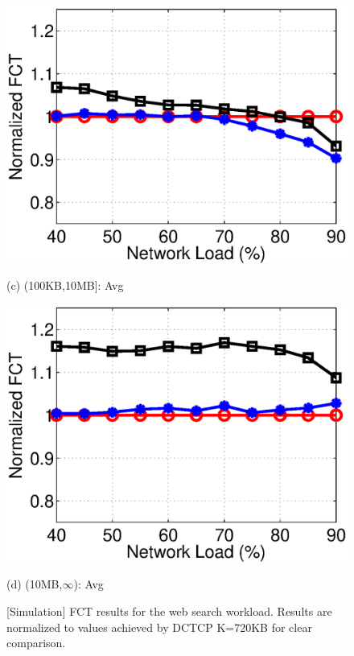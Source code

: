 \begin{figure}[t]
\begin{minipage}{0.245\linewidth}
   \includegraphics[width=1\linewidth]{figs/websearch_medium_avg_fct.eps}
   \centerline{(c) (100KB,10MB]: Avg}
\end{minipage}
\begin{minipage}{0.245\linewidth}
   \includegraphics[width=1\linewidth]{figs/websearch_large_avg_fct.eps}
   \centerline{(d) (10MB,$\infty$): Avg}
\end{minipage}
  \vspace{-1mm}
\caption{[Simulation] FCT results for the web search workload. Results are normalized to values achieved by DCTCP K=720KB for clear comparison.}\label{fig:websearch_fct}
  \vspace{-3mm}
\end{figure}
